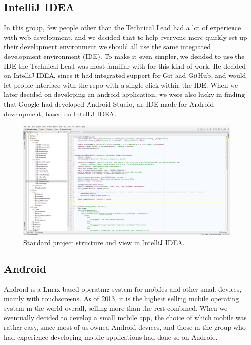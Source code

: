 \subsection{IntelliJ IDEA}
\label{subsec:PlanningSoftwareDevIntelliJ}

In this group, few people other than the Technical Lead had a lot of experience with web development, and we decided that to help everyone more quickly set up their development environment we should all use the same integrated development environment (IDE). To make it even simpler, we decided to use the IDE the Technical Lead was most familiar with for this kind of work. He decided on IntelliJ IDEA, since it had integrated support for Git and GitHub, and would let people interface with the repo with a single click within the IDE. When we later decided on developing an android application, we were also lucky in finding that Google had developed Android Studio, an IDE made for Android development, based on IntelliJ IDEA.

\begin{figure}[ht!]
  \centering
  \includegraphics[width=\linewidth]{./Planning/img/IntelliJ}
  \caption{Standard project structure and view in IntelliJ IDEA.}
  \label{fig:PlanningSoftwareDevIntelliJView}
\end{figure}

\subsection{Android}
\label{subsec:PlanningSoftwareDevAndroid}

Android is a Linux-based operating system for mobiles and other small devices, mainly with touchscreens. As of 2013, it is the highest selling mobile operating system in the world overall, selling more than the rest combined. When we eventually decided to develop a small mobile app, the choice of which mobile was rather easy, since most of us owned Android devices, and those in the group who had experience developing mobile applications had done so on Android.

